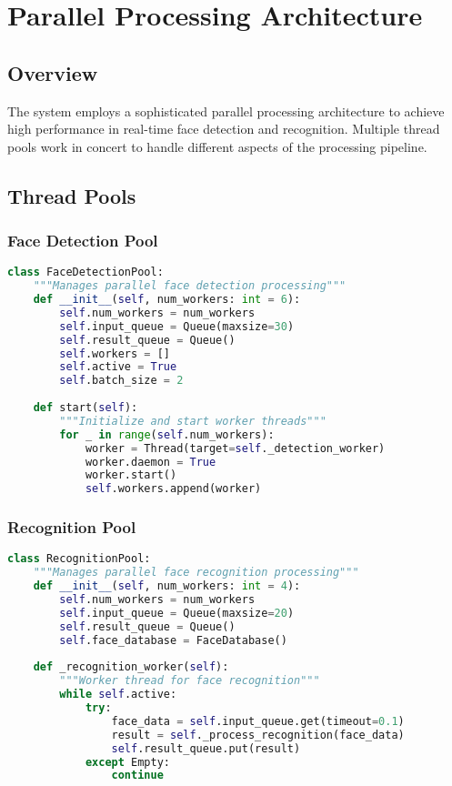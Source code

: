 \chapter{Parallel Processing Architecture}

\section{Overview}
The system employs a sophisticated parallel processing architecture to achieve high performance in real-time face detection and recognition. Multiple thread pools work in concert to handle different aspects of the processing pipeline.

\section{Thread Pools}

\subsection{Face Detection Pool}
\begin{lstlisting}[language=Python]
class FaceDetectionPool:
    """Manages parallel face detection processing"""
    def __init__(self, num_workers: int = 6):
        self.num_workers = num_workers
        self.input_queue = Queue(maxsize=30)
        self.result_queue = Queue()
        self.workers = []
        self.active = True
        self.batch_size = 2
        
    def start(self):
        """Initialize and start worker threads"""
        for _ in range(self.num_workers):
            worker = Thread(target=self._detection_worker)
            worker.daemon = True
            worker.start()
            self.workers.append(worker)
\end{lstlisting}

\subsection{Recognition Pool}
\begin{lstlisting}[language=Python]
class RecognitionPool:
    """Manages parallel face recognition processing"""
    def __init__(self, num_workers: int = 4):
        self.num_workers = num_workers
        self.input_queue = Queue(maxsize=20)
        self.result_queue = Queue()
        self.face_database = FaceDatabase()
        
    def _recognition_worker(self):
        """Worker thread for face recognition"""
        while self.active:
            try:
                face_data = self.input_queue.get(timeout=0.1)
                result = self._process_recognition(face_data)
                self.result_queue.put(result)
            except Empty:
                continue
\end{lstlisting}

